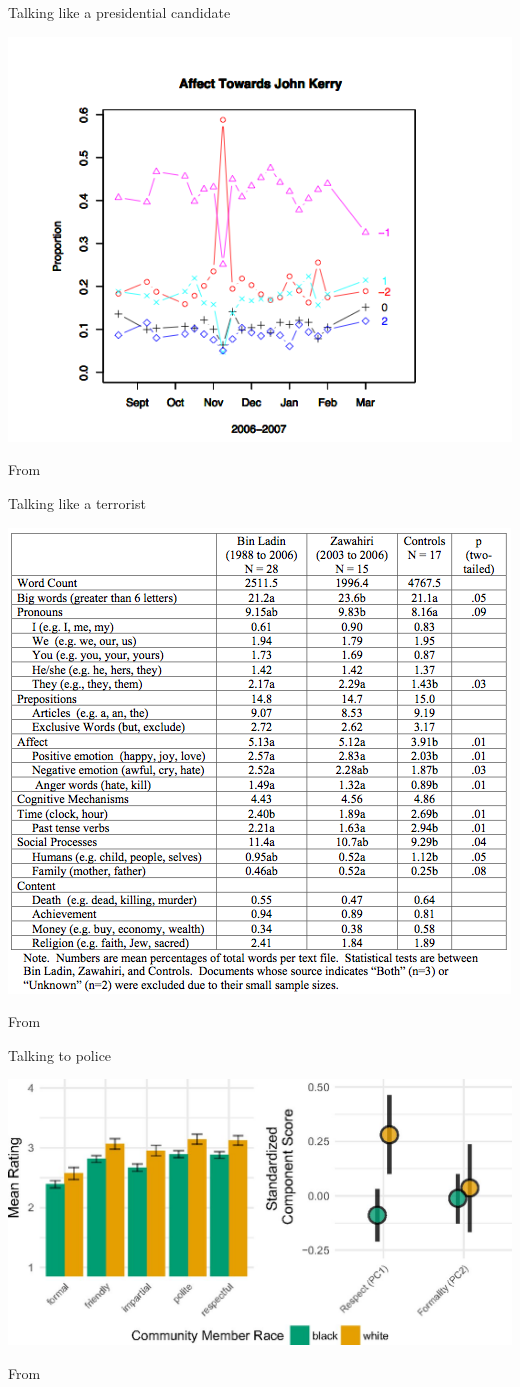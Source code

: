 \documentclass{hertieteaching}
\begin{document}
\begin{frame}{Talking like a presidential candidate}

\centerline{\includegraphics[width=0.55\linewidth]{pictures/kerry-blogs}} 

\centerline{From \textcite{Hopkins.King2010}}

\end{frame}

\begin{frame}{Talking like a terrorist}

\centerline{\includegraphics[width=0.6\linewidth]{pictures/binladen}} 

\centerline{From \textcite{Pennebaker.Chung2008}}

\end{frame}

\begin{frame}{Talking to police}


\centerline{\includegraphics[width=0.7\linewidth]{pictures/respect.jpg}} 

\medskip
\centerline{From \textcite{Voigt.etal2017}}

\end{frame}
\end{document}
